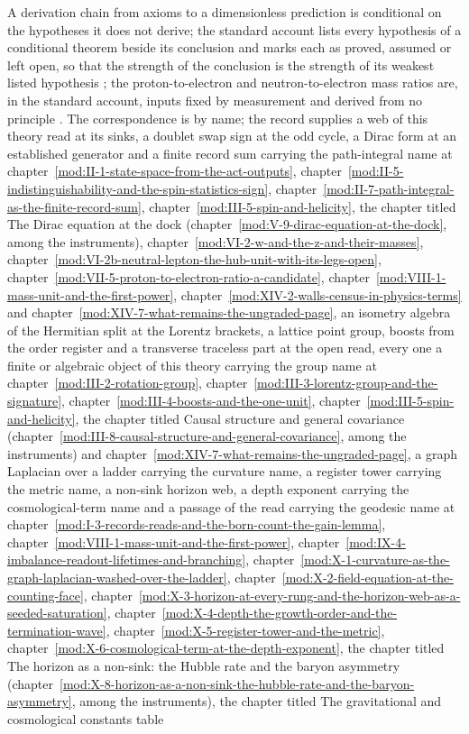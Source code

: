 \begin{chbridge}
A derivation chain from axioms to a dimensionless prediction is conditional on the hypotheses it does not derive; the standard account lists every hypothesis of a conditional theorem beside its conclusion and marks each as proved, assumed or left open, so that the strength of the conclusion is the strength of its weakest listed hypothesis \cite{Weinberg1995}; the proton-to-electron and neutron-to-electron mass ratios are, in the standard account, inputs fixed by measurement and derived from no principle \cite{Gasser1982}. The correspondence is by name; the record supplies a web of this theory read at its sinks, a doublet swap sign at the odd cycle, a Dirac form at an established generator and a finite record sum carrying the path-integral name at chapter~\ref{mod:II-1-state-space-from-the-act-outputs}, chapter~\ref{mod:II-5-indistinguishability-and-the-spin-statistics-sign}, chapter~\ref{mod:II-7-path-integral-as-the-finite-record-sum}, chapter~\ref{mod:III-5-spin-and-helicity}, the chapter titled The Dirac equation at the dock (chapter~\ref{mod:V-9-dirac-equation-at-the-dock}, among the instruments), chapter~\ref{mod:VI-2-w-and-the-z-and-their-masses}, chapter~\ref{mod:VI-2b-neutral-lepton-the-hub-unit-with-its-legs-open}, chapter~\ref{mod:VII-5-proton-to-electron-ratio-a-candidate}, chapter~\ref{mod:VIII-1-mass-unit-and-the-first-power}, chapter~\ref{mod:XIV-2-walls-census-in-physics-terms} and chapter~\ref{mod:XIV-7-what-remains-the-ungraded-page}, an isometry algebra of the Hermitian split at the Lorentz brackets, a lattice point group, boosts from the order register and a transverse traceless part at the open read, every one a finite or algebraic object of this theory carrying the group name at chapter~\ref{mod:III-2-rotation-group}, chapter~\ref{mod:III-3-lorentz-group-and-the-signature}, chapter~\ref{mod:III-4-boosts-and-the-one-unit}, chapter~\ref{mod:III-5-spin-and-helicity}, the chapter titled Causal structure and general covariance (chapter~\ref{mod:III-8-causal-structure-and-general-covariance}, among the instruments) and chapter~\ref{mod:XIV-7-what-remains-the-ungraded-page}, a graph Laplacian over a ladder carrying the curvature name, a register tower carrying the metric name, a non-sink horizon web, a depth exponent carrying the cosmological-term name and a passage of the read carrying the geodesic name at chapter~\ref{mod:I-3-records-reads-and-the-born-count-the-gain-lemma}, chapter~\ref{mod:VIII-1-mass-unit-and-the-first-power}, chapter~\ref{mod:IX-4-imbalance-readout-lifetimes-and-branching}, chapter~\ref{mod:X-1-curvature-as-the-graph-laplacian-washed-over-the-ladder}, chapter~\ref{mod:X-2-field-equation-at-the-counting-face}, chapter~\ref{mod:X-3-horizon-at-every-rung-and-the-horizon-web-as-a-seeded-saturation}, chapter~\ref{mod:X-4-depth-the-growth-order-and-the-termination-wave}, chapter~\ref{mod:X-5-register-tower-and-the-metric}, chapter~\ref{mod:X-6-cosmological-term-at-the-depth-exponent}, the chapter titled The horizon as a non-sink: the Hubble rate and the baryon asymmetry (chapter~\ref{mod:X-8-horizon-as-a-non-sink-the-hubble-rate-and-the-baryon-asymmetry}, among the instruments), the chapter titled The gravitational and cosmological constants table 
\end{chbridge}
